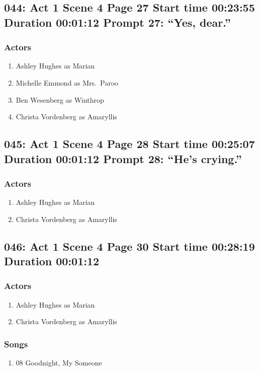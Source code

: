 \subsection{044: Act 1 Scene 4 Page 27 Start time 00:23:55 Duration 00:01:12 Prompt 27: ``Yes, dear.''}

\subsubsection{Actors}
\begin{enumerate}
\item Ashley Hughes as Marian
\item Michelle Emmond as Mrs.~Paroo
\item Ben Wesenberg as Winthrop
\item Christa Vordenberg as Amaryllis
\end{enumerate}


\subsection{045: Act 1 Scene 4 Page 28 Start time 00:25:07 Duration 00:01:12 Prompt 28: ``He's crying.''}

\subsubsection{Actors}
\begin{enumerate}
\item Ashley Hughes as Marian
\item Christa Vordenberg as Amaryllis
\end{enumerate}


\subsection{046: Act 1 Scene 4 Page 30 Start time 00:28:19 Duration 00:01:12}

\subsubsection{Actors}
\begin{enumerate}
\item Ashley Hughes as Marian
\item Christa Vordenberg as Amaryllis
\end{enumerate}

\subsubsection{Songs}
\begin{enumerate}
\item 08 Goodnight, My Someone
\end{enumerate}
